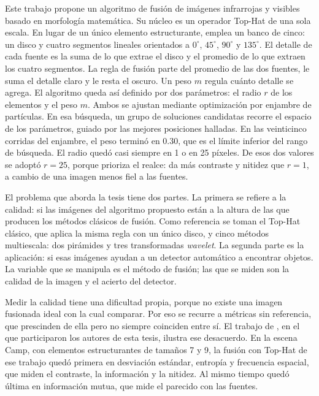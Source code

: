 Este trabajo propone un algoritmo de fusión de imágenes infrarrojas y visibles basado en morfología
matemática. Su núcleo es un operador Top-Hat de una sola escala. En lugar de un único elemento
estructurante, emplea un banco de cinco: un disco y cuatro segmentos lineales orientados a $0^\circ$,
$45^\circ$, $90^\circ$ y $135^\circ$. El detalle de cada fuente es la suma de lo que extrae el disco
y el promedio de lo que extraen los cuatro segmentos. La regla de fusión parte del promedio de las
dos fuentes, le suma el detalle claro y le resta el oscuro. Un peso $m$ regula cuánto detalle se agrega.
El algoritmo queda así definido por dos parámetros: el radio $r$ de los elementos y el peso $m$. Ambos se
ajustan mediante optimización por enjambre de partículas. En esa búsqueda, un grupo de soluciones
candidatas recorre el espacio de los parámetros, guiado por las mejores posiciones halladas. En las
veinticinco corridas del enjambre, el peso terminó en 0.30, que es el límite inferior del rango de búsqueda. El
radio quedó casi siempre en 1 o en 25 píxeles. De esos dos valores se adoptó $r = 25$, porque prioriza
el realce: da más contraste y nitidez que $r = 1$, a cambio de una imagen menos fiel a las fuentes.

El problema que aborda la tesis tiene dos partes. La primera se refiere a la calidad: si las imágenes del
algoritmo propuesto están a la altura de las que producen los métodos clásicos de fusión. Como
referencia se toman el Top-Hat clásico, que aplica la misma regla con un único disco, y cinco métodos
multiescala: dos pirámides y tres transformadas \textit{wavelet}. La segunda parte es la aplicación: si
esas imágenes ayudan a un detector automático a encontrar objetos. La variable que se manipula es el
método de fusión; las que se miden son la calidad de la imagen y el acierto del detector.

Medir la calidad tiene una dificultad propia, porque no existe una imagen fusionada ideal con la cual
comparar. Por eso se recurre a métricas sin referencia, que prescinden de ella pero no siempre coinciden
entre sí. El trabajo de \textcite{bajacfigueredo2024}, en el que participaron los
autores de esta tesis, ilustra ese desacuerdo. En la escena Camp, con elementos estructurantes de tamaños
7 y 9, la fusión con Top-Hat de ese trabajo quedó primera en desviación estándar, entropía y frecuencia
espacial, que miden el contraste, la información y la nitidez. Al mismo tiempo quedó última en
información mutua, que mide el parecido con las fuentes.


